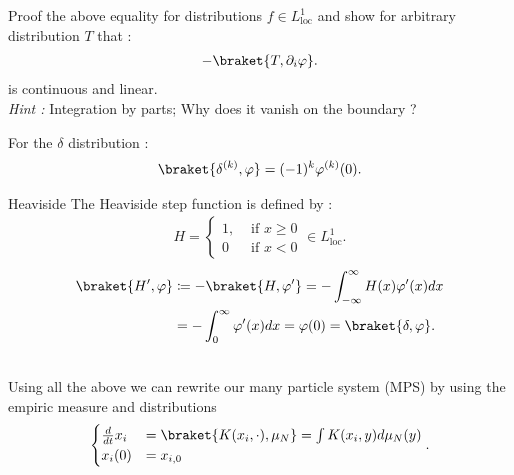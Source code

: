 \begin{exercise}
  Proof the above equality for distributions $f \in  L_{\text{loc}}^{1} $ and show for arbitrary distribution $T$ that :
  \begin{align*}
    -\braket{T,\partial_i \phi }
  .\end{align*}
  is continuous and linear.\\[1ex]
  \textit{Hint : } Integration by parts; Why does it vanish on the boundary ?
\end{exercise}
\begin{example}
 For the $\delta $  distribution : 
 \begin{align*}
   \braket{\delta ^{(k)},\phi  } = (-1)^{k} \phi ^{(k)}(0)
 .\end{align*}
\end{example}
\begin{example}{Heaviside}
The Heaviside step function is defined by :
\begin{align*}
  H = \begin{cases}
    1, &\text{ if }x\ge 0 \\
    0 &\text{ if } x<0
  \end{cases} \in  L_{\text{loc}}^{1} 
.\end{align*}
\begin{align*}
  \braket{H',\phi } &\coloneqq  - \braket{H,\phi'} = - \int_{-\infty}^{\infty} H(x)\phi'(x) dx\\
                    &= - \int_0^{\infty} \phi'(x) dx = \phi(0)  =\braket{\delta,\phi }
.\end{align*}
\begin{figure}[H]
  \begin{center}
  \end{center}
\end{figure}
\end{example}
\hspace{0mm}\\
Using all the above we can rewrite our many particle system  (MPS) by using the empiric measure and distributions 
\begin{align*}
  \begin{cases}
    \frac{d}{dt} x_i &=  \braket{K(x_i,\cdot) , \mu_N}  = \int K(x_i,y) d\mu_N(y)\\ 
    x_i(0) &= x_{i,0}
  \end{cases}
.\end{align*}
